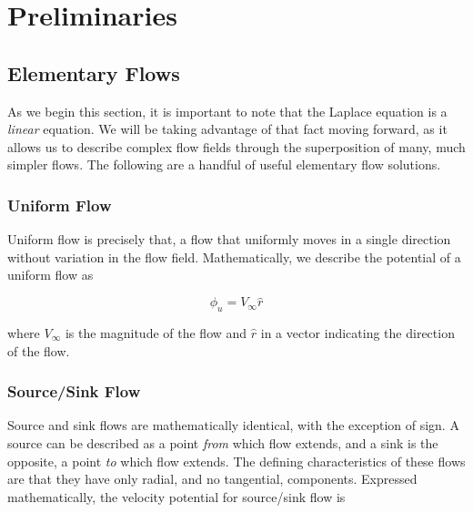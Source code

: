 \section{Preliminaries}
\label{sec:potentialflowpreliminaries}

\subsection{Elementary Flows}
\label{ssec:elemflows}

As we begin this section, it is important to note that the Laplace equation is a \textit{linear} equation.
We will be taking advantage of that fact moving forward, as it allows us to describe complex flow fields through the superposition of many, much simpler flows.
The following are a handful of useful elementary flow solutions.

\subsubsection{Uniform Flow}
Uniform flow is precisely that, a flow that uniformly moves in a single direction without variation in the flow field.
Mathematically, we describe the potential of a uniform flow as

\begin{marginfigure}
	
\end{marginfigure}

\begin{equation}
\label{eqn:uniformflow}
	\phi_{u} = V_\infty \hat{r}
\end{equation}

\noindent where \(V_\infty\) is the magnitude of the flow and \(\hat{r}\) in a vector indicating the direction of the flow.


\subsubsection{Source/Sink Flow}

\begin{marginfigure}
	
\end{marginfigure}

Source and sink flows are mathematically identical, with the exception of sign.
A source can be described as a point \textit{from} which flow extends, and a sink is the opposite, a point \textit{to} which flow extends.
The defining characteristics of these flows are that they have only radial, and no tangential, components.
Expressed mathematically, the velocity potential for source/sink flow is

